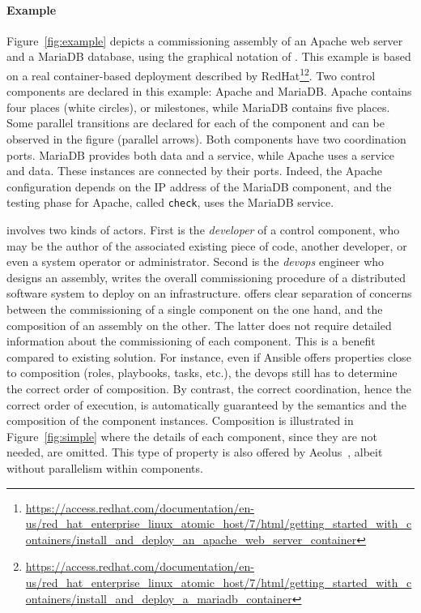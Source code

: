 \paragraph{Example}{
	Figure~\ref{fig:example} depicts a \mad commissioning assembly of an Apache 
	web server and a MariaDB database, using the graphical notation of \mad. 
	This example is based on a real container-based deployment described by 
	RedHat\footnote{\url{https://access.redhat.com/documentation/en-us/red_hat_enterprise_linux_atomic_host/7/html/getting_started_with_containers/install_and_deploy_an_apache_web_server_container}}\footnote{\url{https://access.redhat.com/documentation/en-us/red_hat_enterprise_linux_atomic_host/7/html/getting_started_with_containers/install_and_deploy_a_mariadb_container}}.
	 Two \mad control components are declared in this example: Apache and MariaDB. 
	Apache contains four places (white circles), or milestones, while MariaDB 
	contains five places. Some parallel transitions are declared for each of the 
	component and can be observed in the figure (parallel arrows). Both components 
	have two coordination ports. MariaDB provides both data and a service, while 
	Apache uses a service and data. These instances are connected by their ports. 
	Indeed, the Apache configuration depends on the IP address of the MariaDB 
	component, and the testing phase for Apache, called \texttt{check}, uses the 
	MariaDB service.
} %

\mad involves two kinds of actors. First is the \emph{developer} of a
control component, who may be the author of the associated existing
piece of code, another developer, or even a system operator or
administrator. Second is the \emph{devops} engineer who designs an
assembly, \ie writes the overall commissioning procedure of a
distributed software system to deploy on an infrastructure. \mad
offers clear separation of concerns between the commissioning of a
single component on the one hand, and the composition of an assembly
on the other. The latter does not require detailed information about
the commissioning of each component. This is a benefit compared to
existing solution. For instance, even if Ansible offers properties
close to composition (\eg roles, playbooks, tasks, etc.), the devops
still has to determine the correct order of composition. By contrast,
the correct coordination, hence the correct order of execution, is
automatically guaranteed by the \mad semantics and the composition of
the component instances. Composition is illustrated in
Figure~\ref{fig:simple} where the details of each component, since
they are not needed, are omitted. This type of property is also
offered by Aeolus~\cite{dicosmo2014ic}, albeit without parallelism
within components.

